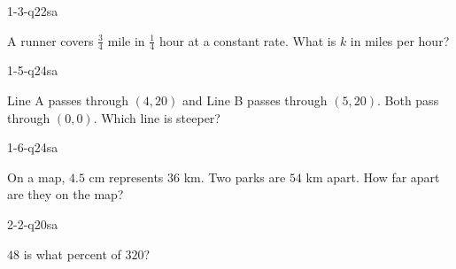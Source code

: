 \documentclass[12pt, fleqn, openany]{studyGuide}
\begin{document}
\renewcommand{\VMBookTitle}{3 Alaska AK STAR Grade 7 Math Practice Tests}
\renewcommand{\VMBookSubtitle}{Full-Length Test Prep with Detailed Answer Explanations}
\renewcommand{\VMFooterURL}{https://viewmath.com/grade7}
\renewcommand{\VMFooterURLDisplay}{ViewMath.com/Grade7}






\tableofcontents
\cleardoublepage
{}


\begin{practiceQuestion}{1-3-q22}{sa}
\begin{questionText}
A runner covers $\frac{3}{4}$ mile in $\frac{1}{4}$ hour at a constant rate. What is $k$ in miles per hour?
\end{questionText}
\end{practiceQuestion}

\begin{practiceQuestion}{1-5-q24}{sa}
\begin{questionText}
Line A passes through $(4, 20)$ and Line B passes through $(5, 20)$. Both pass through $(0, 0)$. Which line is steeper?
\end{questionText}
\end{practiceQuestion}

\begin{practiceQuestion}{1-6-q24}{sa}
\begin{questionText}
On a map, $4.5$ cm represents $36$ km. Two parks are $54$ km apart. How far apart are they on the map?
\end{questionText}
\end{practiceQuestion}

\begin{practiceQuestion}{2-2-q20}{sa}
\begin{questionText}
$48$ is what percent of $320$?
\end{questionText}
\end{practiceQuestion}
\end{document}

